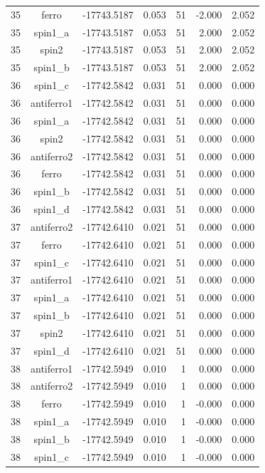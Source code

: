 \begin{longtable}{@{}ccrrrrr@{}}
35 & ferro & -17743.5187 & 0.053 & 51 & -2.000 & 2.052 \\
35 & spin1\_a & -17743.5187 & 0.053 & 51 & 2.000 & 2.052 \\
35 & spin2 & -17743.5187 & 0.053 & 51 & 2.000 & 2.052 \\
35 & spin1\_b & -17743.5187 & 0.053 & 51 & 2.000 & 2.052 \\
\rowcolor{gray!20} 36 & spin1\_c & -17742.5842 & 0.031 & 51 & 0.000 & 0.000 \\
36 & antiferro1 & -17742.5842 & 0.031 & 51 & 0.000 & 0.000 \\
36 & spin1\_a & -17742.5842 & 0.031 & 51 & 0.000 & 0.000 \\
36 & spin2 & -17742.5842 & 0.031 & 51 & 0.000 & 0.000 \\
36 & antiferro2 & -17742.5842 & 0.031 & 51 & 0.000 & 0.000 \\
36 & ferro & -17742.5842 & 0.031 & 51 & 0.000 & 0.000 \\
36 & spin1\_b & -17742.5842 & 0.031 & 51 & 0.000 & 0.000 \\
36 & spin1\_d & -17742.5842 & 0.031 & 51 & 0.000 & 0.000 \\
\rowcolor{gray!20} 37 & antiferro2 & -17742.6410 & 0.021 & 51 & 0.000 & 0.000 \\
37 & ferro & -17742.6410 & 0.021 & 51 & 0.000 & 0.000 \\
37 & spin1\_c & -17742.6410 & 0.021 & 51 & 0.000 & 0.000 \\
37 & antiferro1 & -17742.6410 & 0.021 & 51 & 0.000 & 0.000 \\
37 & spin1\_a & -17742.6410 & 0.021 & 51 & 0.000 & 0.000 \\
37 & spin1\_b & -17742.6410 & 0.021 & 51 & 0.000 & 0.000 \\
37 & spin2 & -17742.6410 & 0.021 & 51 & 0.000 & 0.000 \\
37 & spin1\_d & -17742.6410 & 0.021 & 51 & 0.000 & 0.000 \\
\rowcolor{gray!20} 38 & antiferro1 & -17742.5949 & 0.010 & 1 & 0.000 & 0.000 \\
38 & antiferro2 & -17742.5949 & 0.010 & 1 & 0.000 & 0.000 \\
38 & ferro & -17742.5949 & 0.010 & 1 & -0.000 & 0.000 \\
38 & spin1\_a & -17742.5949 & 0.010 & 1 & -0.000 & 0.000 \\
38 & spin1\_b & -17742.5949 & 0.010 & 1 & -0.000 & 0.000 \\
38 & spin1\_c & -17742.5949 & 0.010 & 1 & -0.000 & 0.000 \\

\end{longtable}
